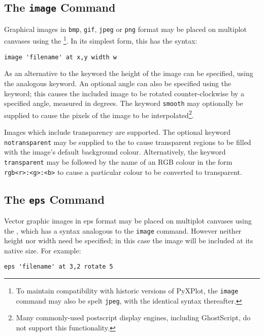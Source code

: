 
\subsection{The {\tt image} Command}

Graphical images in {\tt bmp}, {\tt gif}, {\tt jpeg} or {\tt png} format may be
placed on multiplot canvases using the \footnote{To maintain
compatibility with historic versions of PyXPlot, the {\tt image} command may
also be spelt {\tt jpeg}, with the identical syntax thereafter.}. In its
simplest form, this has the syntax:
\begin{verbatim}
image 'filename' at x,y width w
\end{verbatim}

As an alternative to the  keyword the height of the image can be
specified, using the analogous  keyword.  An optional angle can
also be specified using the  keyword; this causes the included
image to be rotated counter-clockwise by a specified angle, measured in
degrees.  The keyword {\tt smooth} may optionally be supplied to cause the
pixels of the image to be interpolated\footnote{Many commonly-used postscript
display engines, including GhostScript, do not support this functionality.}.

Images which include transparency are supported. The optional keyword {\tt
notransparent} may be supplied to the  to cause transparent
regions to be filled with the image's default background colour. Alternatively,
the keyword {\tt transparent} may be followed by the name of an RGB colour in
the form {\tt rgb<r>:<g>:<b>} to cause a particular colour to be converted to
transparent.

\subsection{The {\tt eps} Command}

Vector graphic images in eps format may be placed on multiplot canvases
using the , which has a syntax analogous to the {\tt image}
command.  However neither height nor width need be specified; in this case the
image will be included at its native size.  For example:

\begin{verbatim}
eps 'filename' at 3,2 rotate 5
\end{verbatim}

